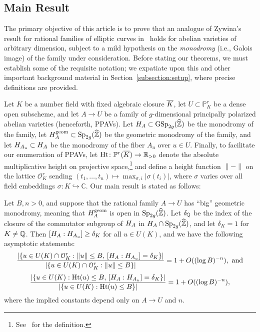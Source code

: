 \subsection{Main Result}\label{weaintevergonnaberoyals}

The primary objective of this article is to prove that an analogue of Zywina's result for rational families of elliptic curves in~\cite[Theorem 1.15]{zywina2010hilbert} holds for abelian varieties of arbitrary dimension, subject to a mild hypothesis on the \emph{monodromy} (i.e., Galois image) of the family under consideration. Before stating our theorems, we must establish some of the requisite notation; we expatiate upon this and other important background material in Section~\ref{subsection:setup}, where precise definitions are provided.

Let $K$ be a number field with fixed algebraic closure $\overline{K}$, let $U \subset \mathbb P^r_K$ be a dense open subscheme, and let $A \rightarrow U$ be a family of $g$-dimensional principally polarized abelian varieties (henceforth, PPAVs). Let $H_A \subset \operatorname{GSp}_{2g}(\widehat{\mathbb Z})$ be the monodromy of the family, let $H^{\operatorname{geom}}_A \subset \operatorname{Sp}_{2g}(\widehat{\mathbb Z})$ be the geometric monodromy of the family, and let $H_{A_u} \subset H_A$ be the monodromy of the fiber $A_u$ over $u \in U$. Finally, to facilitate our enumeration of PPAVs, let $\operatorname{Ht}\colon\mathbb P^r(\overline K) \rightarrow \mathbb R_{>0}$
denote the absolute multiplicative height on projective space,\footnote{See~\cite[Section B.2, p.~174]{afraidofheights} for the definition.}
and define a height function $\| - \|$ on the lattice $\mathcal O^r_K$
sending $\left( t_1, \ldots, t_n \right) \mapsto \max_{\sigma,i}|\sigma(t_i)|$,
where $\sigma$ varies over all field embeddings $\sigma\colon K \hookrightarrow \mathbb C$.
Our main result is stated as follows:
\begin{theorem} \label{theorem:main}
	Let $B, n > 0$, and suppose that the rational family $A \to U$ has ``big'' geometric monodromy, meaning that $H_A^{\operatorname{geom}}$ is open in $\operatorname{Sp}_{2g}(\widehat{{\mathbb Z}})$. Let $\delta_\mathbb Q$ be the index of the closure of the commutator subgroup of $H_A$ in $H_A \cap \operatorname{Sp}_{2g}(\widehat{{\mathbb Z}})$, and let $\delta_K = 1$ for $K \neq \mathbb Q$. Then $[H_A : H_{A_u}] \geq \delta_K$ for all $u \in U(K)$, and we have the following asymptotic statements:
			\[
				\frac{|\{u \in U(K) \cap \mathcal{O}_K^r : \lVert u \rVert \le B,\, [H_A : H_{A_u}] = \delta_K\}|}{|\{u \in U(K) \cap \mathcal{O}_K^r : \lVert u \rVert \le B\}|} = 1 + O((\log B)^{-n}), \text{ and}
			\]
\[
				\frac{|\{u \in U(K) : \operatorname{Ht}(u) \leq B,\, [H_A : H_{A_u}] = \delta_K\}|}{|\{u \in U(K) : \operatorname{Ht}(u) \le B\}|} = 1 + O((\log B)^{-n}),
			\]
	 where the implied constants depend only on $A \to U$ and $n$.
\end{theorem}

